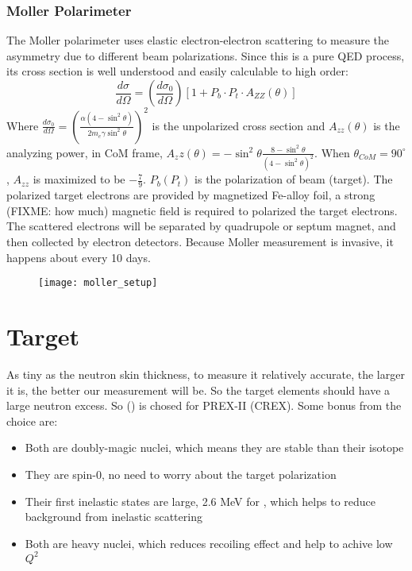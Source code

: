 \subsubsection{Moller Polarimeter}
The Moller polarimeter uses elastic electron-electron scattering to measure the
asymmetry due to different beam polarizations. Since this is a pure QED process,
its cross section is well understood and easily calculable to high order:
\begin{equation*}
    \frac{d\sigma}{d\Omega} = \left( \frac{d\sigma_0}{d\Omega} \right) [ 1 + P_b \cdot P_t \cdot A_{ZZ}(\theta)]
\end{equation*}
Where $\frac{d\sigma_0}{d\Omega} = \left( \frac{\alpha(4 - \sin^2\theta)}{2m_e\gamma\sin^2\theta }\right)^2$ is the unpolarized cross section and $A_{zz}(\theta)$ is the analyzing power, 
in CoM frame, $A_zz(\theta) = -\sin^2\theta \frac{8 - \sin^2\theta}{(4-\sin^2\theta)^2}$.
When $\theta_{CoM} = 90^\circ$, $A_{zz}$ is maximized to be $-\frac{7}{9}$.
$P_b (P_t)$ is the polarization of beam (target). The polarized target electrons
are provided by magnetized Fe-alloy foil, a strong (FIXME: how much) magnetic 
field is required to polarized the target electrons. The scattered electrons will
be separated by quadrupole or septum magnet, and then collected by electron 
detectors. Because Moller measurement is invasive, it happens about every 10 days.
\begin{figure}[h!]
    \centering
    \texttt{[image: moller\_setup]}
\end{figure}

\section{Target}
As tiny as the neutron skin thickness, to measure it relatively accurate, the
larger it is, the better our measurement will be. So the target elements should
have a large neutron excess. So \Pb (\Ca) is chosed for PREX-II (CREX). Some
bonus from the choice are:
\begin{itemize}
    \item Both are doubly-magic nuclei, which means they are stable than their
	isotope
    \item They are spin-0, no need to worry about the target polarization
    \item Their first inelastic states are large, 2.6 MeV for \Ca, which helps
	to reduce background from inelastic scattering
    \item Both are heavy nuclei, which reduces recoiling effect and help
	to achive low $Q^2$
\end{itemize}

